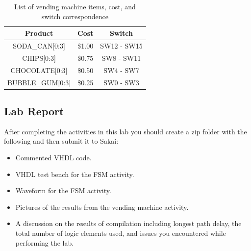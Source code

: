\begin{table}[H]
	\centering
	\caption{List of vending machine items, cost, and switch correspondence}
	\begin{tabular}{ | c | c | c | }
		\hline                        
 		\bf Product & \bf Cost & \bf Switch\\ \hline
 		SODA\_CAN[0:3] & \$1.00 & SW12 - SW15 \\ \hline
		CHIPS[0:3] & \$0.75 & SW8 - SW11 \\ \hline
		CHOCOLATE[0:3] & \$0.50 & SW4 - SW7 \\ \hline
		BUBBLE\_GUM[0:3] & \$0.25 & SW0 - SW3 \\
 		\hline
	\end{tabular}
	\label{tab:costlist}
\end{table}


\subsection{Lab Report}

After completing the activities in this lab you should create a zip folder with the following and then submit it to Sakai:

\begin{itemize}
	\item Commented VHDL code.
	\item VHDL test bench for the FSM activity.
	\item Waveform for the FSM activity.
	\item Pictures of the results from the vending machine activity.
	\item A discussion on the results of compilation including longest path delay, the total number of logic elements used, and issues you encountered while performing the lab.
\end{itemize}


